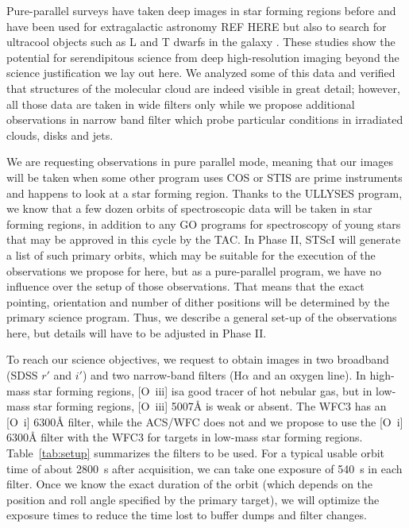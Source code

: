 \documentclass[12pt]{article}
\begin{document}
Pure-parallel surveys have taken deep images in star forming regions before and have been used for extragalactic astronomy REF HERE but also to search for ultracool objects such as L and T dwarfs in the galaxy \citep{2005ApJ...631L.159R}. These studies show the potential for serendipitous science from deep high-resolution imaging beyond the science justification we lay out here. We analyzed some of this data and verified that structures of the molecular cloud are indeed visible in great detail; however, all those data are taken in wide filters only while we propose additional observations in narrow band filter which probe particular conditions in irradiated clouds, disks and jets.


%
%
\describeobservations   %
We are requesting observations in pure parallel mode, meaning that our images will be taken when some other program uses COS or STIS are prime instruments and happens to look at a star forming region. Thanks to the ULLYSES program, we know that a few dozen orbits of spectroscopic data will be taken in star forming regions, in addition to any GO programs for spectroscopy of young stars that may be approved in this cycle by the TAC. In Phase II, STScI will generate a list of such primary orbits, which may be suitable for the execution of the observations we propose for here, but as a pure-parallel program, we have no influence over the setup of those observations. That means that the exact pointing, orientation and number of dither positions will be determined by the primary science program. Thus, we describe a general set-up of the observations here, but details will have to be adjusted in Phase II.

To reach our science objectives, we request to obtain images in two broadband (SDSS $r'$ and $i'$) and two narrow-band filters (H$\alpha$ and an oxygen line). In high-mass star forming regions, [O~{\sc iii}] isa good tracer of hot nebular gas, but in low-mass star forming regions, [O~{\sc iii}] 5007\AA{} is weak or absent. The WFC3 has an [O~{\sc i}] 6300\AA{} filter, while the ACS/WFC does not and we propose to use the [O~{\sc i}] 6300\AA{} filter with the WFC3 for targets in low-mass star forming regions. Table~\ref{tab:setup} summarizes the filters to be used.
For a typical usable orbit time of about 2800~s after acquisition, we can take one exposure of 540~s in each filter. Once we know the exact duration of the orbit (which depends on the position and roll angle specified by the primary target), we will optimize the exposure times to reduce the time lost to buffer dumps and filter changes.
\end{document}
